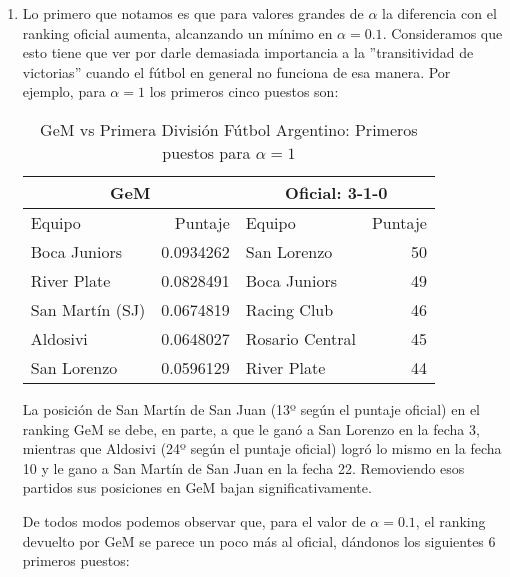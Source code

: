 \begin{enumerate}
    \item Lo primero que notamos es que para valores grandes de $\alpha$ la
        diferencia con el ranking oficial aumenta, alcanzando un mínimo en
        $\alpha=0.1$. Consideramos que esto tiene que ver por darle demasiada
        importancia a la ''transitividad de victorias'' cuando el fútbol en
        general no funciona de esa manera. Por ejemplo, para $\alpha=1$ los
        primeros cinco puestos son:

        \begin{table}[H]
            \centering
            \caption{GeM vs Primera Divisi\'on F\'utbol Argentino: Primeros puestos para $\alpha=1$}
            \setlength{\tabcolsep}{3pt}
            \begin{tabular}{|l|r||l|r|}
                \hline\hline
                \multicolumn{2}{|c||}{GeM}&\multicolumn{2}{c|}{Oficial: 3-1-0}\\
                \hline
                Equipo & Puntaje & Equipo & Puntaje\\
                \hline\hline
                Boca Juniors &0.0934262& San Lorenzo &50 \\
                River Plate &0.0828491& Boca Juniors &49 \\
                San Martín (SJ) &0.0674819& Racing Club &46 \\
                Aldosivi &0.0648027& Rosario Central &45 \\
                San Lorenzo &0.0596129& River Plate &44 \\
                \hline\hline
            \end{tabular}
        \end{table}
        \medskip

        \par La posición de San Martín de San Juan (13º según el puntaje
        oficial) en el ranking GeM se debe, en parte, a que le ganó a San
        Lorenzo en la fecha 3, mientras que Aldosivi (24º según el puntaje
        oficial) logró lo mismo en la fecha 10 y le gano a San Martín de San
        Juan en la fecha 22. Removiendo esos partidos sus posiciones en GeM
        bajan significativamente.

        \par De todos modos podemos observar que, para el valor de $\alpha=0.1$,
        el ranking devuelto por GeM se parece un poco más al oficial, d\'andonos
        los siguientes 6 primeros puestos:


\end{enumerate}
